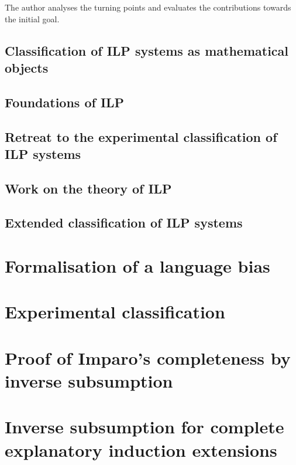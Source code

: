 The author analyses the turning points and evaluates the contributions towards the initial goal.

\subsection{Classification of ILP systems as mathematical objects}
\subsection{Foundations of ILP}
\subsection{Retreat to the experimental classification of ILP systems}
\subsection{Work on the theory of ILP}
\subsection{Extended classification of ILP systems}

\section{Formalisation of a language bias}
\section{Experimental classification}
\section{Proof of Imparo's completeness by inverse subsumption}
\section{Inverse subsumption for complete explanatory induction extensions}